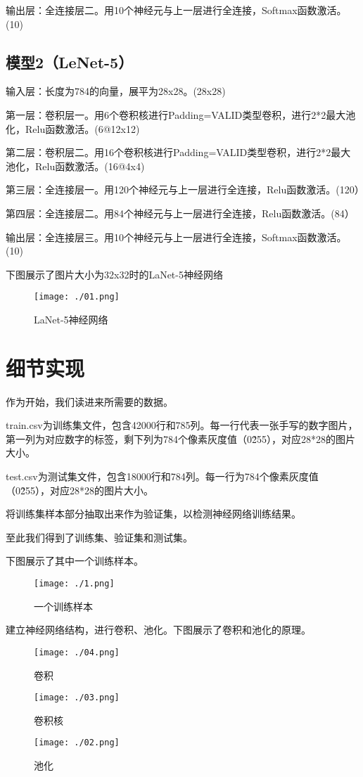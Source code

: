 \documentclass{article}
\begin{document}
  输出层：全连接层二。用10个神经元与上一层进行全连接，Softmax函数激活。(10)
  
  \subsection{模型2（LeNet-5）}

  输入层：长度为784的向量，展平为28x28。(28x28)
  
  第一层：卷积层一。用6个卷积核进行Padding=VALID类型卷积，进行2*2最大池化，Relu函数激活。(6@12x12)
  
  第二层：卷积层二。用16个卷积核进行Padding=VALID类型卷积，进行2*2最大池化，Relu函数激活。(16@4x4)
  
  第三层：全连接层一。用120个神经元与上一层进行全连接，Relu函数激活。(120）

  第四层：全连接层二。用84个神经元与上一层进行全连接，Relu函数激活。(84）
  
  输出层：全连接层三。用10个神经元与上一层进行全连接，Softmax函数激活。(10)

  下图展示了图片大小为32x32时的LaNet-5神经网络
   \begin{figure}[H]
  \centering\texttt{[image: ./01.png]}
  \caption{LaNet-5神经网络}
  \end{figure}


\section{细节实现}

作为开始，我们读进来所需要的数据。

train.csv为训练集文件，包含42000行和785列。每一行代表一张手写的数字图片，第一列为对应数字的标签，剩下列为784个像素灰度值（0\~255），对应28*28的图片大小。

test.csv为测试集文件，包含18000行和784列。每一行为784个像素灰度值（0\~255），对应28*28的图片大小。

将训练集样本部分抽取出来作为验证集，以检测神经网络训练结果。

至此我们得到了训练集、验证集和测试集。

下图展示了其中一个训练样本。

 \begin{figure}[H]
  \centering\texttt{[image: ./1.png]}
  \caption{一个训练样本}
  \end{figure}

建立神经网络结构，进行卷积、池化。下图展示了卷积和池化的原理。
 \begin{figure}[H]
  \centering\texttt{[image: ./04.png]}
  \caption{卷积}
  \centering\texttt{[image: ./03.png]}
  \caption{卷积核}
  \centering\texttt{[image: ./02.png]}
  \caption{池化}
  \end{figure}
\end{document}
